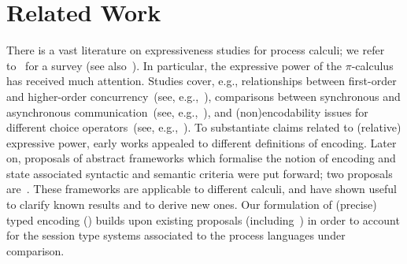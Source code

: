 \section{Related Work}
\label{sec:related}

There is a vast literature on expressiveness studies for process calculi;
we refer to~\cite{DBLP:journals/entcs/Parrow08} for a survey
(see also~\cite[\S\,2.3]{PerezPhD10}). 
In particular, the expressive power of the $\pi$-calculus has received much attention.
Studies cover, e.g., 
relationships between first-order and higher-order concurrency~(see, e.g.,~\cite{San923,San96int}),
comparisons between 
synchronous and asynchronous communication~(see, e.g.,~\cite{Boudol92,Palamidessi03,BeauxisPV08}),
and
(non)encodability issues for different choice operators~(see, e.g.,~\cite{Nestmann00,DBLP:conf/esop/PetersNG13}).
To substantiate claims related to (relative) expressive power,
early works appealed to different definitions of encoding.
Later on, 
proposals of abstract 
frameworks which formalise the notion of encoding 
and state associated syntactic and semantic criteria 
were put forward; 
two proposals are~\cite{DBLP:journals/iandc/Gorla10,DBLP:journals/tcs/FuL10}. 
These frameworks are applicable to different calculi, and 
have shown useful to clarify known results and to derive new ones.
Our formulation of (precise) typed encoding () 
builds upon existing proposals (including~\cite{Palamidessi03,DBLP:journals/iandc/Gorla10,DBLP:conf/icalp/LanesePSS10})
in order to account for the session type systems
associated to the process languages under comparison.


